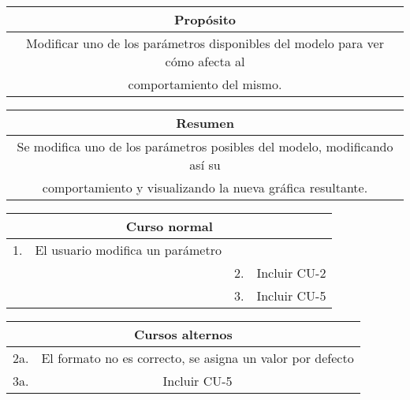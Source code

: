 \begin{table}[!h]
\begin{tabular}{|c|}
\hline
\cellcolor{cyan} \textbf{Propósito} \\
\hline
Modificar uno de los parámetros disponibles del modelo para ver cómo afecta al \\ comportamiento del mismo.   \\
\hline
\end{tabular}
\end{table}

\begin{table}[!h]
\begin{tabular}{|c|}
\hline
\cellcolor{cyan} \textbf{Resumen}  \\
\hline
Se modifica uno de los parámetros posibles del modelo, modificando así su \\ comportamiento y visualizando la nueva gráfica resultante.   \\
\hline
\end{tabular}
\end{table}

\begin{table}[!h]
\begin{tabular}{|c|c|c|c|}
\hline
\multicolumn{4}{|c|}{ \cellcolor{cyan}Curso normal} \\
\hline
      1.        &  El usuario modifica un parámetro     &              &              \\
\hline
              &               &       2.       &      Incluir CU-2         \\
\hline
              &               &       3.       &      Incluir CU-5        \\

\hline
\end{tabular}
\end{table}

\begin{table}[!h]
\begin{tabular}{|c|c|}
\hline
\multicolumn{2}{|c|}{\cellcolor{cyan} \textbf{Cursos alternos}} \\
\hline
       2a.       &      El formato no es correcto, se asigna un valor por defecto        \\
\hline
       3a.       &      Incluir CU-5        \\
\hline
\end{tabular}
\end{table}

